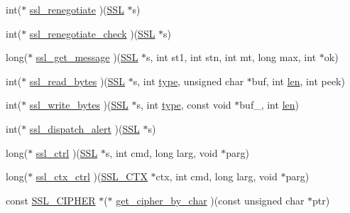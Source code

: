 \begin{DoxyCompactItemize}
\item 
int($\ast$ \hyperlink{structssl__method__st_a68ba7cb568d9c9c3e2bd15020a30beb0}{ssl\+\_\+renegotiate} )(\hyperlink{ossl__typ_8h_a71f21e09bf365489dab9d85bd4785e24}{S\+SL} $\ast$s)
\item 
int($\ast$ \hyperlink{structssl__method__st_a07e92db03c1a7907ed8346916c038215}{ssl\+\_\+renegotiate\+\_\+check} )(\hyperlink{ossl__typ_8h_a71f21e09bf365489dab9d85bd4785e24}{S\+SL} $\ast$s)
\item 
long($\ast$ \hyperlink{structssl__method__st_a128347c6e6007078bc17af9c64b566f3}{ssl\+\_\+get\+\_\+message} )(\hyperlink{ossl__typ_8h_a71f21e09bf365489dab9d85bd4785e24}{S\+SL} $\ast$s, int st1, int stn, int mt, long max, int $\ast$ok)
\item 
int($\ast$ \hyperlink{structssl__method__st_a9f992bd27f8e79cf166c9783bdc29932}{ssl\+\_\+read\+\_\+bytes} )(\hyperlink{ossl__typ_8h_a71f21e09bf365489dab9d85bd4785e24}{S\+SL} $\ast$s, int \hyperlink{x509_8h_ab512b8f495325c7ea0f5a5a5d3f938eb}{type}, unsigned char $\ast$buf, int \hyperlink{x509_8h_ad8c3db4434e9cb5cd772cc009f40e856}{len}, int peek)
\item 
int($\ast$ \hyperlink{structssl__method__st_a20933c416539a546d3749a725e0602e7}{ssl\+\_\+write\+\_\+bytes} )(\hyperlink{ossl__typ_8h_a71f21e09bf365489dab9d85bd4785e24}{S\+SL} $\ast$s, int \hyperlink{x509_8h_ab512b8f495325c7ea0f5a5a5d3f938eb}{type}, const void $\ast$buf\+\_\+, int \hyperlink{x509_8h_ad8c3db4434e9cb5cd772cc009f40e856}{len})
\item 
int($\ast$ \hyperlink{structssl__method__st_a1164901a31bb98ce046b971a09b29321}{ssl\+\_\+dispatch\+\_\+alert} )(\hyperlink{ossl__typ_8h_a71f21e09bf365489dab9d85bd4785e24}{S\+SL} $\ast$s)
\item 
long($\ast$ \hyperlink{structssl__method__st_a00f03ff5d9c47885e4cf9340ccb91dd8}{ssl\+\_\+ctrl} )(\hyperlink{ossl__typ_8h_a71f21e09bf365489dab9d85bd4785e24}{S\+SL} $\ast$s, int cmd, long larg, void $\ast$parg)
\item 
long($\ast$ \hyperlink{structssl__method__st_a894ef584342f0b95ab4156cada689c99}{ssl\+\_\+ctx\+\_\+ctrl} )(\hyperlink{ossl__typ_8h_a1a21892c1193ee6eb572c2c72d3924ca}{S\+S\+L\+\_\+\+C\+TX} $\ast$ctx, int cmd, long larg, void $\ast$parg)
\item 
const \hyperlink{ssl_8h_a548d7a5d565a9e0e9bd45c49f8c95701}{S\+S\+L\+\_\+\+C\+I\+P\+H\+ER} $\ast$($\ast$ \hyperlink{structssl__method__st_a51d27641af1ef292ad991acab889eb69}{get\+\_\+cipher\+\_\+by\+\_\+char} )(const unsigned char $\ast$ptr)
\item 

\end{DoxyCompactItemize}
